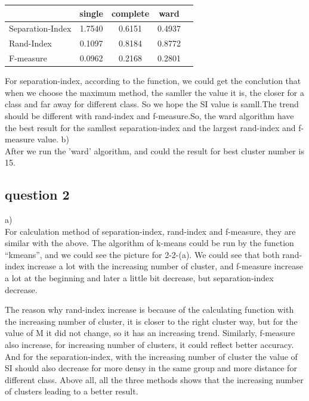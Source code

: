 \documentclass[]{article}
\begin{document}



\begin{tabular}
	{l*{3}{c}r}   	& single  & complete & ward \\ \hline
	Separation-Index& 1.7540 & 0.6151 & 0.4937  \\ 
	Rand-Index & 0.1097 & 0.8184 & 0.8772 \\
	F-measure & 0.0962 & 0.2168 & 0.2801 \\
	

\end{tabular}



For separation-index, according to the function, we could get the conclution that when we choose the maximum method, the samller the value it is, the closer for a class and far away for different class. So we hope the SI value is samll.The trend should be different with rand-index and f-measure.So, the ward algorithm have the best result for the samllest separation-index and the largest rand-index and f-measure value. 
b)\\

After we run the 'ward' algorithm, and could the result for best cluster number is 15.

\subsection{question 2}

a) \\

For calculation method of separation-index, rand-index and f-measure, they are similar with the above. The algorithm of k-means could be run by the function “kmeans”, and we could see the picture for 2-2-(a). We could see that both rand-index increase a lot with the increasing number of cluster, and f-measure increase a lot at the beginning and later a little bit decrease, but separation-index decrease.

The reason why rand-index increase is because of the calculating function with the increasing number of cluster, it is closer to the right cluster way, but for the value of M it did not change, so it has an increasing trend. Similarly, f-measure also increase, for increasing number of clusters, it could reflect better accuracy. And for the separation-index, with the increasing number of cluster the value of SI should also decrease for more densy in the same group and more distance for different class. Above all, all the three methods shows that the increasing number of clusters leading to a better result.
\end{document}
